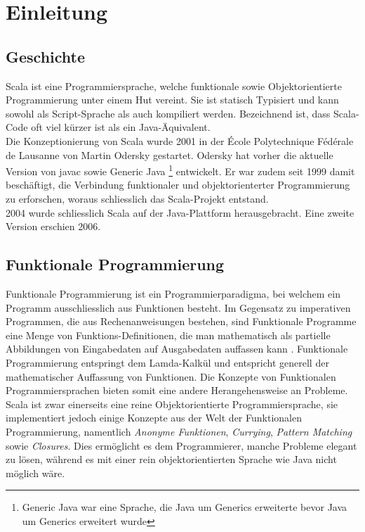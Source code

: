 \chapter{Einleitung}

\section{Geschichte}

Scala ist eine Programmiersprache, welche funktionale sowie 
Objektorientierte Programmierung unter einem Hut vereint. Sie
ist statisch Typisiert und kann sowohl als Script-Sprache
als auch kompiliert werden. Bezeichnend ist, dass Scala-Code
oft viel kürzer ist als ein Java-Äquivalent.\\

Die Konzeptionierung von Scala wurde 2001 in der École Polytechnique
Fédérale de Lausanne von Martin Odersky gestartet. Odersky hat
vorher die aktuelle Version von javac sowie Generic Java 
\footnote{Generic Java war eine Sprache, die Java um Generics erweiterte
bevor Java um Generics erweitert wurde}
entwickelt. Er war zudem seit 1999 damit beschäftigt, die Verbindung
funktionaler und objektorienterter Programmierung zu erforschen, woraus
schliesslich das Scala-Projekt entstand. \\

2004 wurde schliesslich Scala auf der Java-Plattform herausgebracht. Eine
zweite Version erschien 2006.

\section{Funktionale Programmierung}

Funktionale Programmierung ist ein Programmierparadigma, bei welchem
ein Programm ausschliesslich aus Funktionen besteht. Im Gegensatz
zu imperativen Programmen, die aus Rechenanweisungen bestehen, sind
Funktionale Programme eine Menge von Funktions-Definitionen, die man
mathematisch als partielle Abbildungen von Eingabedaten auf Ausgabedaten
auffassen kann \cite{wikipediaFunktional}. Funktionale Programmierung
entspringt dem Lamda-Kalkül und entspricht generell der mathematischer
Auffassung von Funktionen. Die Konzepte von Funktionalen
Programmiersprachen bieten somit eine andere Herangehensweise an Probleme.\\

Scala ist zwar einerseits eine reine Objektorientierte Programmiersprache,
sie implementiert jedoch einige Konzepte aus der Welt der Funktionalen
Programmierung, namentlich \emph{Anonyme Funktionen}, \emph{Currying},
\emph{Pattern Matching} sowie \emph{Closures}. Dies ermöglicht es dem
Programmierer, manche Probleme elegant zu lösen, während es mit
einer rein objektorientierten Sprache wie Java nicht möglich wäre.


